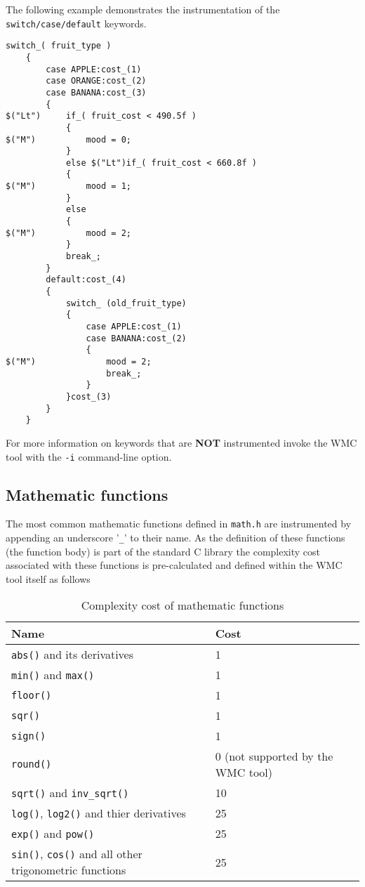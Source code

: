The following example demonstrates the instrumentation of the \verb|switch/case/default| keywords. 

\begin{Verbatim}[fontsize=\small]
    switch_( fruit_type )
    {
        case APPLE:cost_(1)
        case ORANGE:cost_(2)
        case BANANA:cost_(3)
        {
$("Lt")     if_( fruit_cost < 490.5f )
            {
$("M")          mood = 0;
            }
            else $("Lt")if_( fruit_cost < 660.8f )
            {
$("M")          mood = 1;
            }
            else
            {
$("M")          mood = 2;
            }
            break_;
        }
        default:cost_(4) 
        {
            switch_ (old_fruit_type)
            {
                case APPLE:cost_(1)
                case BANANA:cost_(2)
                {
$("M")              mood = 2;
                    break_;
                }
            }cost_(3)
        }
    }
\end{Verbatim}

For more information on keywords that are \textbf{NOT} instrumented invoke the WMC tool with the \verb|-i| command-line option.

\subsection{Mathematic functions}

The most common mathematic functions defined in \verb|math.h| are instrumented by appending an underscore '\verb|_|' to their name. As the definition of these functions (the function body) is part of the standard C library the complexity cost associated with these functions is pre-calculated and defined within the WMC tool itself as follows

\begin{table}[!hb]
\centering\small
\caption{Complexity cost of mathematic functions}
\begin{tabular}{|l|l|} 
\hline
\textbf{Name} & \textbf{Cost} \\
\hline
\verb|abs()| and its derivatives & 1 \\
\verb|min()| and \verb|max()| & 1 \\
\verb|floor()| & 1 \\
\verb|sqr()| & 1 \\
\verb|sign()| & 1 \\
\verb|round()| & 0 (not supported by the WMC tool) \\
\verb|sqrt()| and \verb|inv_sqrt()| & 10 \\
\verb|log()|, \verb|log2()| and thier derivatives & 25 \\
\verb|exp()| and \verb|pow()| & 25 \\
\verb|sin()|, \verb|cos()| and all other trigonometric functions & 25 \\
\hline
\end{tabular}
\label{tab:cost_of_math_functions}
\end{table}


